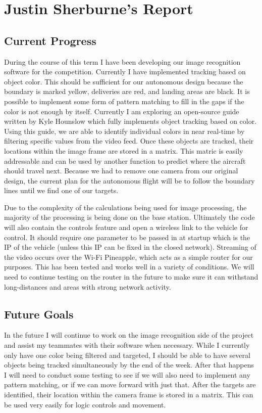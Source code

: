 \documentclass[onecolumn, draftclsnofoot,10pt, compsoc]{IEEEtran}
\begin{document}
\section{Justin Sherburne's Report}

\subsection{Current Progress}

During the course of this term I have been developing our image recognition software for the competition. Currently I have implemented tracking based on object color. This should be sufficient for our autonomous design because the boundary is marked yellow, deliveries are red, and landing areas are black. It is possible to implement some form of pattern matching to fill in the gaps if the color is not enough by itself. Currently I am exploring an open-source guide written by Kyle Hounslow which fully implements object tracking based on color. Using this guide, we are able to identify individual colors in near real-time by filtering specific values from the video feed. Once these objects are tracked, their locations within the image frame are stored in a matrix. This matric is easily addressable and can be used by another function to predict where the aircraft should travel next. Because we had to remove one camera from our original design, the current plan for the autonomous flight will be to follow the boundary lines until we find one of our targets. 

Due to the complexity of the calculations being used for image processing, the majority of the processing is being done on the base station. Ultimately the code will also contain the controls feature and open a wireless link to the vehicle for control. It should require one parameter to be passed in at startup which is the IP of the vehicle (unless this IP can be fixed in the closed network). Streaming of the video occurs over the Wi-Fi Pineapple, which acts as a simple router for our purposes. This has been tested and works well in a variety of conditions. We will need to continue testing on the router in the future to make sure it can withstand long-distances and areas with strong network activity.


\subsection{Future Goals}

In the future I will continue to work on the image recognition side of the project and assist my teammates with their software when necessary. While I currently only have one color being filtered and targeted, I should be able to have several objects being tracked simultaneously by the end of the week. After that happens I will need to conduct some testing to see if we will also need to implement any pattern matching, or if we can move forward with just that. After the targets are identified, their location within the camera frame is stored in a matrix. This can be used very easily for logic controls and movement.
\end{document}

